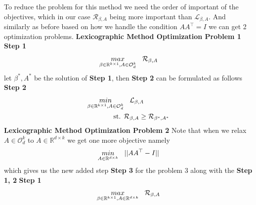 To reduce the problem for this method we need the order of important of the objectives, which in our case $\mathcal{R}_{\beta, A}$ being more important than $\mathcal{L}_{\beta, A}$. And similarly as before based on how we handle the condition $AA^\top = I$ we can get 2 optimization problems.
\newline \textbf{Lexicographic Method Optimization Problem 1}
\newline \textbf{Step 1}
\begin{equation} \label{LMOP_1:step_1}
\begin{aligned}
    \underset{\beta\in \mathbb{R}^{k\times 1},A\in \mathcal{O}^{k}_{d}}{max}& \hspace{3mm} \mathcal{R}_{\beta, A}\\
\end{aligned}
\end{equation}
let $\beta^{*}, A^{*}$ be the solution of \textbf{Step 1}, then \textbf{Step 2} can be formulated as follows
\newline \textbf{Step 2}
\begin{equation}\label{LMOP_1:step_2}
\begin{aligned}
    \underset{\beta\in \mathbb{R}^{k\times 1},A\in \mathcal{O}^{k}_{d}}{min}& \hspace{3mm} \mathcal{L}_{\beta, A}\\
    \text{st.  }& \mathcal{R}_{\beta, A} \ge \mathcal{R}_{\beta^{*}, A^{*}}
\end{aligned}
\end{equation}
\newline \textbf{Lexicographic Method Optimization Problem 2}
\newline Note that when we relax $A \in \mathcal{O}_d^k$ to $A \in \mathbb{R}^{d\times k}$ we get one more objective namely 
\begin{equation}
\begin{aligned}
\underset{A\in \mathbb{R}^{d\times k}}{min} \hspace{3mm} || AA^\top -I|| 
\end{aligned}
\end{equation}
which gives us the new added step \textbf{Step 3} for the problem 3 along with the \textbf{Step 1, 2} 
\newline \textbf{Step 1}
\begin{equation} \label{LMOP_2:step_1}
\begin{aligned}
    \underset{\beta\in \mathbb{R}^{k\times 1},A\in \mathbb{R}^{d\times k}}{max}& \hspace{3mm} \mathcal{R}_{\beta, A}\\
\end{aligned}
\end{equation}
